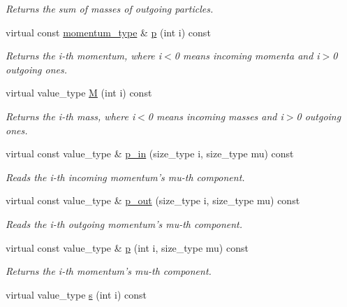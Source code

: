 \begin{DoxyCompactItemize}
\begin{DoxyCompactList}\small\item\em Returns the sum of masses of outgoing particles. \end{DoxyCompactList}\item 
virtual const \hyperlink{a00559}{momentum\-\_\-type} \& \hyperlink{a00442_a2b06ea836491c920c2eb03ca6785e453}{p} (int i) const 
\begin{DoxyCompactList}\small\item\em Returns the i-\/th momentum, where i$<$0 means incoming momenta and i$>$0 outgoing ones. \end{DoxyCompactList}\item 
virtual value\-\_\-type \hyperlink{a00442_a8165335a5beea72aaa9c97a224d43313}{M} (int i) const 
\begin{DoxyCompactList}\small\item\em Returns the i-\/th mass, where i$<$0 means incoming masses and i$>$0 outgoing ones. \end{DoxyCompactList}\item 
\hypertarget{a00442_a93e2650607db42a9cc3581e5ac937e6c}{virtual const value\-\_\-type \& \hyperlink{a00442_a93e2650607db42a9cc3581e5ac937e6c}{p\-\_\-in} (size\-\_\-type i, size\-\_\-type mu) const }\label{a00442_a93e2650607db42a9cc3581e5ac937e6c}

\begin{DoxyCompactList}\small\item\em Reads the i-\/th incoming momentum's mu-\/th component. \end{DoxyCompactList}\item 
\hypertarget{a00442_a6ca6d42c507ab098658c2395ecf7a226}{virtual const value\-\_\-type \& \hyperlink{a00442_a6ca6d42c507ab098658c2395ecf7a226}{p\-\_\-out} (size\-\_\-type i, size\-\_\-type mu) const }\label{a00442_a6ca6d42c507ab098658c2395ecf7a226}

\begin{DoxyCompactList}\small\item\em Reads the i-\/th outgoing momentum's mu-\/th component. \end{DoxyCompactList}\item 
\hypertarget{a00442_ae50c1bc5dffde20bc9cfadb235c5b0e8}{virtual const value\-\_\-type \& \hyperlink{a00442_ae50c1bc5dffde20bc9cfadb235c5b0e8}{p} (int i, size\-\_\-type mu) const }\label{a00442_ae50c1bc5dffde20bc9cfadb235c5b0e8}

\begin{DoxyCompactList}\small\item\em Returns the i-\/th momentum's mu-\/th component. \end{DoxyCompactList}\item 
\hypertarget{a00442_a871734b21e34bf0b091362b93bf3e7d1}{virtual value\-\_\-type \hyperlink{a00442_a871734b21e34bf0b091362b93bf3e7d1}{s} (int i) const }\label{a00442_a871734b21e34bf0b091362b93bf3e7d1}


\end{DoxyCompactItemize}
